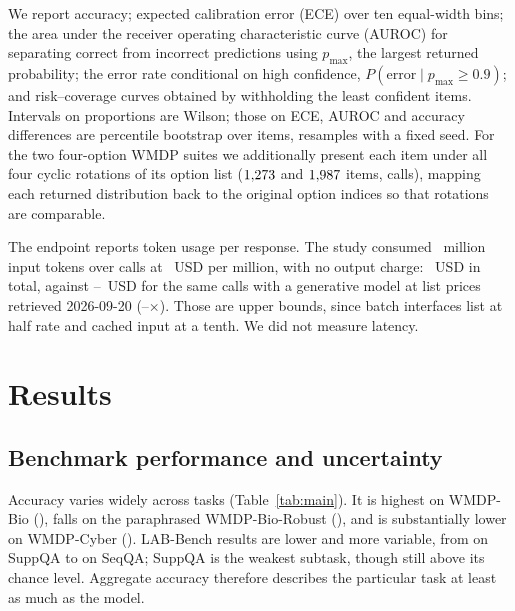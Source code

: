 \documentclass[conference]{IEEEtran}
\newcommand{\pmax}{p_{\max}}
\begin{document}
We report accuracy; expected calibration error (ECE) over ten equal-width bins; the area
under the receiver operating characteristic curve (AUROC) for separating correct from
incorrect predictions using $\pmax$, the largest returned probability; the error rate
conditional on high confidence, $P(\text{error} \mid \pmax \geq 0.9)$; and risk--coverage
curves obtained by withholding the least confident items. Intervals on proportions are
Wilson; those on ECE, AUROC and accuracy differences are percentile bootstrap over items,
\statNBootCI{} resamples with a fixed seed. For the two four-option WMDP suites we
additionally present each item under all four cyclic rotations of its option list
($1{,}273{}$ and $1{,}987{}$ items, \statNCallsCircular{} calls),
mapping each returned distribution back to the original option indices so that rotations
are comparable.

The endpoint reports token usage per response. The study consumed
\statInputTokens{}~million input tokens over \statNCallsTotal{} calls at
\statUsdPerM{}~USD per million, with no output charge: \statUsdTotal{}~USD in total,
against \statLlmCheapUsd{}--\statLlmTopUsd{}~USD for the same calls with a generative
model at list prices retrieved 2026-09-20
(\statLlmCheapRatio{}--\statLlmTopRatio{}$\times$). Those are upper bounds, since batch
interfaces list at half rate and cached input at a tenth. We did not measure latency.



\section{Results}

\subsection{Benchmark performance and uncertainty}
\label{sec:uncertainty}

Accuracy varies widely across tasks (Table~\ref{tab:main}). It is highest on WMDP-Bio
(\statAccBio{}), falls on the paraphrased WMDP-Bio-Robust (\statAccBioRobust{}), and is
substantially lower on WMDP-Cyber (\statAccCyber{}). LAB-Bench results are lower and more variable, from \statLabMin{} on SuppQA to
\statLabMax{} on SeqQA; SuppQA is the weakest subtask, though still above its
\statChanceSupp{} chance level. Aggregate accuracy therefore describes the
particular task at least as much as the model.
\end{document}
